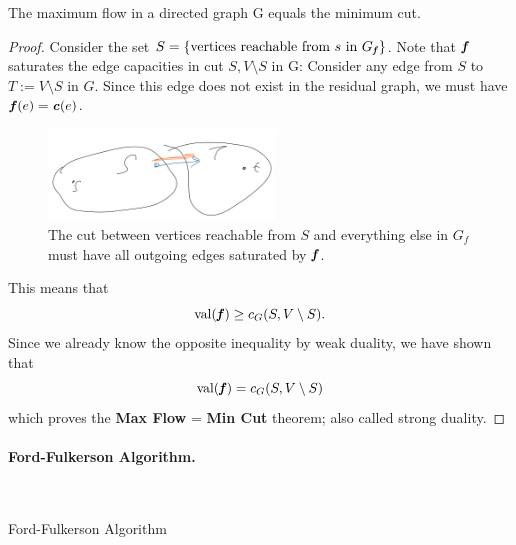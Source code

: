 \begin{theorem}[Max Flow $=$ Min Cut theorem] The maximum flow in a directed graph G equals the minimum cut.
\end{theorem}
\begin{proof}
Consider the set $S = \left\{ \text{vertices reachable from } s \text{ in
  } G_{\boldsymbol{\mathit{f}}} \right\}$.
Note that \(\boldsymbol{\mathit{f}}\) saturates the
edge capacities in cut \(S,V\setminus S\) in G:
Consider any edge from $S$ to $T:=V \setminus S$ in $G$. Since this edge does not
exist in the residual graph, we must have $\boldsymbol{\mathit{f}}(e) = \boldsymbol{\mathit{c}}(e)$.
\begin{figure}[H]
 \centering
 \includegraphics[width=60mm,scale=0.5]{fig/fig14_lec10.PNG}
 \caption{The cut between vertices reachable from $S$ and everything
   else in $G_f$ must have all outgoing edges saturated by $\boldsymbol{\mathit{f}}$.}
  \label{fig:ex14}
\end{figure}
%
This means that
\begin{equation} \nonumber
   \operatorname*{val}(\boldsymbol{\mathit{f}}) \geq c_G(S, V \setminus S).
\end{equation}
Since we already know the opposite inequality by weak duality, we have
shown that
\begin{equation} \nonumber
   \operatorname*{val}(\boldsymbol{\mathit{f}}) = c_G(S, V \setminus S)
\end{equation}
which proves the \textbf{Max Flow} = \textbf{Min Cut} theorem; also called strong duality.
\end{proof}

\paragraph{Ford-Fulkerson Algorithm.}\ \\
\begin{algorithm}[H]
\SetAlgoLined
 \caption{Ford-Fulkerson Algorithm}
\end{algorithm}


